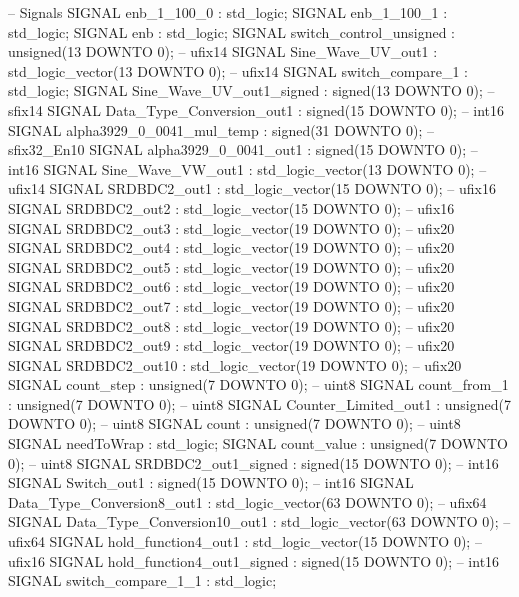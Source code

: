 \begin{mylisting}[language=VHDL,caption=MSSRDCDB制御\&SVPWMモジュール,label=appF_Control_top2_module_VHDL]
  -- Signals
  SIGNAL enb_1_100_0                      : std_logic;
  SIGNAL enb_1_100_1                      : std_logic;
  SIGNAL enb                              : std_logic;
  SIGNAL switch_control_unsigned          : unsigned(13 DOWNTO 0);  -- ufix14
  SIGNAL Sine_Wave_UV_out1                : std_logic_vector(13 DOWNTO 0);  -- ufix14
  SIGNAL switch_compare_1                 : std_logic;
  SIGNAL Sine_Wave_UV_out1_signed         : signed(13 DOWNTO 0);  -- sfix14
  SIGNAL Data_Type_Conversion_out1        : signed(15 DOWNTO 0);  -- int16
  SIGNAL alpha3929_0_0041_mul_temp        : signed(31 DOWNTO 0);  -- sfix32_En10
  SIGNAL alpha3929_0_0041_out1            : signed(15 DOWNTO 0);  -- int16
  SIGNAL Sine_Wave_VW_out1                : std_logic_vector(13 DOWNTO 0);  -- ufix14
  SIGNAL SRDBDC2_out1                     : std_logic_vector(15 DOWNTO 0);  -- ufix16
  SIGNAL SRDBDC2_out2                     : std_logic_vector(15 DOWNTO 0);  -- ufix16
  SIGNAL SRDBDC2_out3                     : std_logic_vector(19 DOWNTO 0);  -- ufix20
  SIGNAL SRDBDC2_out4                     : std_logic_vector(19 DOWNTO 0);  -- ufix20
  SIGNAL SRDBDC2_out5                     : std_logic_vector(19 DOWNTO 0);  -- ufix20
  SIGNAL SRDBDC2_out6                     : std_logic_vector(19 DOWNTO 0);  -- ufix20
  SIGNAL SRDBDC2_out7                     : std_logic_vector(19 DOWNTO 0);  -- ufix20
  SIGNAL SRDBDC2_out8                     : std_logic_vector(19 DOWNTO 0);  -- ufix20
  SIGNAL SRDBDC2_out9                     : std_logic_vector(19 DOWNTO 0);  -- ufix20
  SIGNAL SRDBDC2_out10                    : std_logic_vector(19 DOWNTO 0);  -- ufix20
  SIGNAL count_step                       : unsigned(7 DOWNTO 0);  -- uint8
  SIGNAL count_from_1                     : unsigned(7 DOWNTO 0);  -- uint8
  SIGNAL Counter_Limited_out1             : unsigned(7 DOWNTO 0);  -- uint8
  SIGNAL count                            : unsigned(7 DOWNTO 0);  -- uint8
  SIGNAL needToWrap                       : std_logic;
  SIGNAL count_value                      : unsigned(7 DOWNTO 0);  -- uint8
  SIGNAL SRDBDC2_out1_signed              : signed(15 DOWNTO 0);  -- int16
  SIGNAL Switch_out1                      : signed(15 DOWNTO 0);  -- int16
  SIGNAL Data_Type_Conversion8_out1       : std_logic_vector(63 DOWNTO 0);  -- ufix64
  SIGNAL Data_Type_Conversion10_out1      : std_logic_vector(63 DOWNTO 0);  -- ufix64
  SIGNAL hold_function4_out1              : std_logic_vector(15 DOWNTO 0);  -- ufix16
  SIGNAL hold_function4_out1_signed       : signed(15 DOWNTO 0);  -- int16
  SIGNAL switch_compare_1_1               : std_logic;

\end{mylisting}
